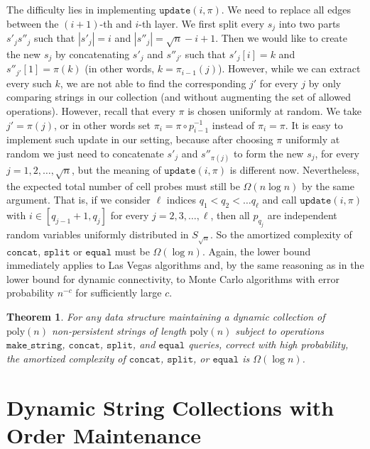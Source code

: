 \documentclass[a4paper]{article}
\newtheorem{theorem}{Theorem}[section]
\theoremstyle{remark}
\newcommand{\makeop}{\mathtt{make\_string}}
\newcommand{\eqop}{\mathtt{equal}}
\newcommand{\concop}{\mathtt{concat}}
\newcommand{\splitop}{\mathtt{split}}
\newcommand{\poly}{\mathrm{poly}}
\newcommand{\updateop}{\mathtt{update}}
\begin{document}
The difficulty lies in implementing $\updateop(i,\pi)$. We need to replace all edges between
the $(i+1)$-th and $i$-th layer. We first split every $s_j$ into two parts $s'_j s''_j$ such that
$|s'_j| = i$ and $|s''_j| = \sqrt{n}-i+1$. Then we would like to create the new $s_j$
by concatenating $s'_j$ and $s''_{j'}$ such that $s'_j[i]=k$ and $s''_{j'}[1]=\pi(k)$
(in other words, $k = \pi_{i-1}(j)$). However, while we can extract every such $k$,
we are not able to find the corresponding $j'$ for every $j$ by only comparing
strings in our collection (and without augmenting the set of allowed operations).
However, recall that every $\pi$ is chosen uniformly at random. We take $j' = \pi(j)$,
or in other words set $\pi_i = \pi \circ p^{-1}_{i-1}$ instead of $\pi_i = \pi$.
It is easy to implement such update in our setting, because after choosing $\pi$
uniformly at random we just need to concatenate $s'_j$ and $s''_{\pi(j)}$ to form
the new $s_j$, for every $j=1,2,\ldots,\sqrt{n}$, but the meaning of $\updateop(i,\pi)$
is different now. Nevertheless, the expected total
number of cell probes must still be $\Omega(n\log n)$ by the same argument. That is,
if we consider $\ell$ indices $q_1 < q_2 < \ldots q_\ell$
and call $\updateop(i,\pi)$ with $i\in [q_{j-1}+1,q_j]$ for
every $j=2,3,\ldots,\ell$, then all $p_{q_j}$ are independent random variables uniformly
distributed in $S_{\sqrt{n}}$. So the amortized complexity of $\concop$, $\splitop$ or
$\eqop$ must be $\Omega(\log n)$. Again, the lower bound immediately
applies to Las Vegas algorithms and, by the same reasoning as in the lower bound for
dynamic connectivity, to Monte Carlo algorithms with error probability $n^{-c}$
for sufficiently large $c$.


\begin{theorem}
\label{thm:polylowerbound}
For any data structure maintaining a dynamic collection of $\poly(n)$ non-persistent strings of length
$\poly(n)$ subject to operations $\makeop$, $\concop$, $\splitop$, and
$\eqop$ queries, correct with high probability, the amortized complexity of
$\concop$, $\splitop$, or $\eqop$ is $\Omega(\log n)$.
\end{theorem}

\section{Dynamic String Collections with Order Maintenance}\label{sec:om}

\newcommand{\prevst}{\mathtt{prev}}
\newcommand{\succst}{\mathtt{succ}}
\newcommand{\findst}{\mathtt{find}}
\newcommand{\insertst}{\mathtt{insert}}
\newcommand{\nilst}{\mathtt{nil}}
\newcommand{\sub}{\subseteq}
\newcommand{\sm}{\setminus}
\newcommand{\utrie}{\overline{T}}
\newcommand{\trie}{T}
\end{document}
